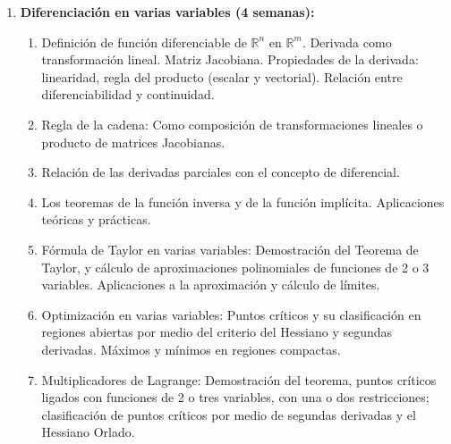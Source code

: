 \begin{refsection}
\begin{enumerate}
\item \textbf{Diferenciaci\'on en varias variables (4 semanas):}
\begin{enumerate}
\item Definición de función diferenciable de $\mathbb{R}^n$ en $\mathbb{R}^m$.  Derivada como transformación lineal.  Matriz Jacobiana. Propiedades de la derivada: linearidad, regla del producto (escalar y vectorial).  Relación entre diferenciabilidad y continuidad.
\item Regla de la cadena: Como composición de transformaciones lineales o producto de matrices Jacobianas.
\item Relación de las derivadas parciales con el concepto de diferencial.
\item Los teoremas de la función inversa y de la función implícita. Aplicaciones teóricas y prácticas.
\item Fórmula de Taylor en varias variables: Demostración del Teorema de Taylor, y cálculo de aproximaciones polinomiales de funciones de 2 o 3 variables.  Aplicaciones a la aproximación y cálculo de límites.
\item Optimización en varias variables: Puntos críticos y su clasificación en regiones abiertas por medio del criterio del Hessiano y segundas derivadas. Máximos y mínimos en regiones compactas.
\item Multiplicadores de Lagrange: Demostración del teorema, puntos críticos ligados con funciones de 2 o tres variables, con una o dos restricciones; clasificación de puntos críticos por medio de segundas derivadas y el Hessiano Orlado.
\end{enumerate}






\end{enumerate}
\end{refsection}

